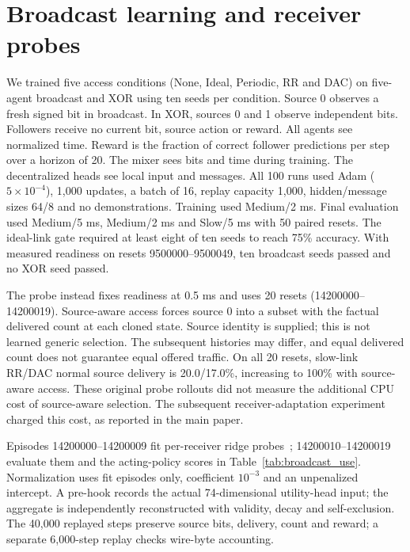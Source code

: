\documentclass[10pt,a4paper]{article}
\begin{document}
\section{Broadcast learning and receiver probes}\label{app:probe}
We trained five access conditions (None, Ideal, Periodic, RR and DAC) on five-agent broadcast and XOR using ten seeds per condition. Source 0 observes a fresh signed bit in broadcast. In XOR, sources 0 and 1 observe independent bits. Followers receive no current bit, source action or reward. All agents see normalized time. Reward is the fraction of correct follower predictions per step over a horizon of 20. The mixer sees bits and time during training. The decentralized heads see local input and messages. All 100 runs used Adam ($5\times10^{-4}$), 1,000 updates, a batch of 16, replay capacity 1,000, hidden/message sizes 64/8 and no demonstrations. Training used Medium/2 ms. Final evaluation used Medium/5 ms, Medium/2 ms and Slow/5 ms with 50 paired resets. The ideal-link gate required at least eight of ten seeds to reach 75\% accuracy. With measured readiness on resets 9500000--9500049, ten broadcast seeds passed and no XOR seed passed.

The probe instead fixes readiness at 0.5 ms and uses 20 resets (14200000--14200019). Source-aware access forces source 0 into a subset with the factual delivered count at each cloned state. Source identity is supplied; this is not learned generic selection. The subsequent histories may differ, and equal delivered count does not guarantee equal offered traffic. On all 20 resets, slow-link RR/DAC normal source delivery is 20.0/17.0\%, increasing to 100\% with source-aware access. These original probe rollouts did not measure the additional CPU cost of source-aware selection. The subsequent receiver-adaptation experiment charged this cost, as reported in the main paper.

Episodes 14200000--14200009 fit per-receiver ridge probes~\citep{hoerl1970ridge}; 14200010--14200019 evaluate them and the acting-policy scores in Table~\ref{tab:broadcast_use}. Normalization uses fit episodes only, coefficient $10^{-3}$ and an unpenalized intercept. A pre-hook records the actual 74-dimensional utility-head input; the aggregate is independently reconstructed with validity, decay and self-exclusion. The 40,000 replayed steps preserve source bits, delivery, count and reward; a separate 6,000-step replay checks wire-byte accounting.
\end{document}
